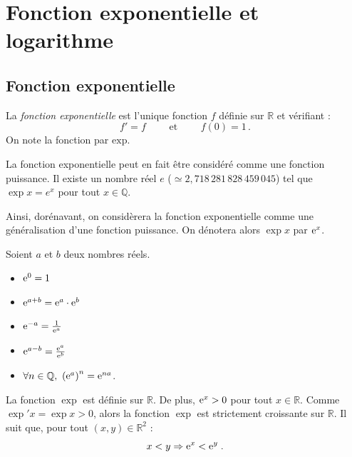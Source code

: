 
\TCDLessonStyleOn
\chapter{Fonction exponentielle et logarithme}
\section{Fonction exponentielle}
      \begin{defi}
            La \emph{fonction exponentielle} est l'unique fonction $f$ d\'efinie sur $\mathbb{R}$ et v\'erifiant : 
                  \[   f' = f \qquad \text{ et } \qquad f(0) = 1   \,. \]
            On note la fonction par $\mathrm{exp}$.
      \end{defi}
      \begin{prop}
            La fonction exponentielle peut en fait \^etre consid\'er\'e comme une fonction puissance.
            Il existe un nombre r\'eel $e$ ($\simeq 2,718\,281\,828\,459\,045$) 
            tel que $\exp{x} = e^{x}$ pour tout $x\in\mathbb{Q}$.
            
            Ainsi, dor\'enavant, on consid\`erera la fonction exponentielle comme 
            une g\'en\'eralisation d'une fonction puissance.
            On d\'enotera alors $\exp{x}$ par $\mathrm{e}^{x}$.
      \end{prop}
      \begin{thm}
            Soient $a$ et $b$ deux nombres r\'eels.
            \begin{itemize}
                  \item $\mathrm{e}^{0} = 1$
                  \item $\mathrm{e}^{a+b} = \mathrm{e}^{a} \cdot \mathrm{e}^{b}$
                  \item $\mathrm{e}^{-a} = \frac{1}{\mathrm{e}^{a}}$
                  \item $\mathrm{e}^{a-b} = \frac{\mathrm{e}^{a}}{\mathrm{e}^{b}}$
                  \item $\forall n \in \mathbb{Q},\ \left(\expo{a}\right)^n = \expo{na}$.
            \end{itemize}
      \end{thm}
      \begin{prop}
            La fonction $\exp$ est d\'efinie sur $\mathbb{R}$.
            De plus, $\mathrm{e}^{x} > 0$ pour tout $x\in\mathbb{R}$.
            Comme $\exp' x = \exp x > 0$, alors la fonction $\exp$ est strictement croissante sur $\mathbb{R}$.
            Il suit que, pour tout $(x,y)\in\mathbb{R}^2$ :
                  \[
                        x<y \Rightarrow \mathrm{e}^{x} < \mathrm{e}^{y}      \;.
                  \]
      \end{prop}
